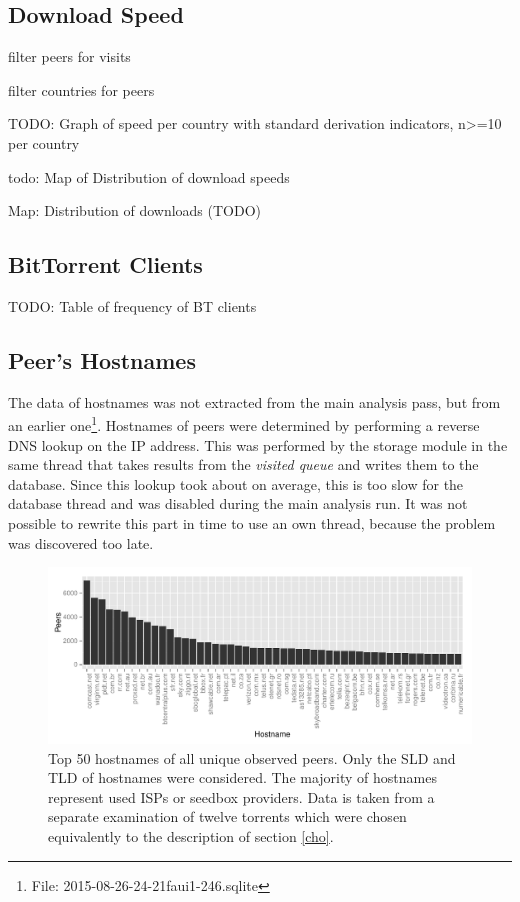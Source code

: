 \documentclass[10pt, a4paper, twoside, headsepline]{scrbook}
\renewcommand{\_}{\origunderscore\allowbreak}
\begin{document}
\subsection{Download Speed}
filter peers for visits

filter countries for peers

TODO: Graph of speed per country with standard derivation indicators, n>=10 per country

todo: Map of Distribution of download speeds

Map: Distribution of downloads (TODO)

\subsection{BitTorrent Clients}
\label{clients}
TODO: Table of frequency of BT clients

\subsection{Peer's Hostnames}
The data of hostnames was not extracted from the main analysis pass, but from an earlier one\footnote{File: 2015-08-26\_11-24-21\_faui1-246.sqlite}. Hostnames of peers were determined by performing a reverse DNS lookup on the IP address. This was performed by the storage module in the same thread that takes results from the \emph{visited queue} and writes them to the database. Since this lookup took about  on average, this is too slow for the database thread and was disabled during the main analysis run. It was not possible to rewrite this part in time to use an own thread, because the problem was discovered too late.

\begin{figure}
\centering
\includegraphics[width=\textwidth]{../result/2015-08-26_11-24-21_faui1-246_hostnames}
\caption[Most observed ISPs by hostnames]{Top 50 hostnames of all unique observed peers. Only the SLD and TLD of hostnames were considered. The majority of hostnames represent used ISPs or seedbox providers. Data is taken from a separate examination of twelve torrents which were chosen equivalently to the description of section \ref{cho}.}
\label{hostname}
\end{figure}
\end{document}
